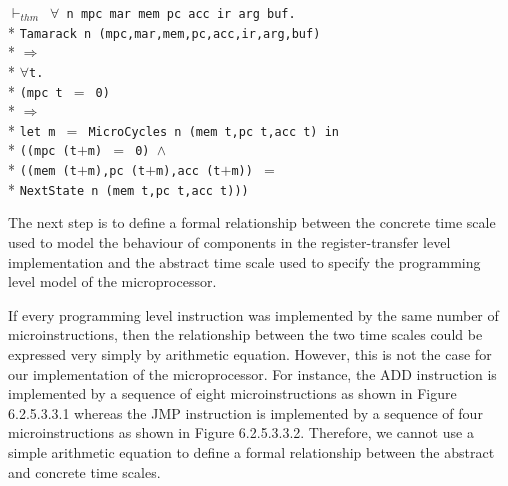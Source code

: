 \begin{normalsize}
\hspace*{\fill}
\begin{minipage}{17cm}
$\vdash_{thm}$\verb" "$\forall$\verb" n mpc mar mem pc acc ir arg buf."\\*
\verb"Tamarack n (mpc,mar,mem,pc,acc,ir,arg,buf)"\\*
$\Longrightarrow$\\*
$\forall$\verb"t."\\*
\verb"(mpc t "$=$\verb" 0)"\\*
$\Longrightarrow$\\*
\verb"let m "$=$\verb" MicroCycles n (mem t,pc t,acc t) in"\\*
\verb"((mpc (t"$+$\verb"m) "$=$\verb" 0) "$\wedge$\\*
\verb"((mem (t"$+$\verb"m),pc (t"$+$\verb"m),acc (t"$+$\verb"m)) "$=$\\*
\verb"NextState n (mem t,pc t,acc t)))"
\end{minipage}
\hspace*{\fill}

The next step is to
define a formal relationship between the concrete time scale used to model
the behaviour of components in the register-transfer level implementation
and the abstract time scale used to specify the programming
level model of the microprocessor.

If every programming level
instruction was implemented by the same number of microinstructions,
then the relationship between the two time scales could be expressed very
simply by arithmetic equation.
However, this is not the case for our implementation of the microprocessor.
For instance, the ADD instruction is implemented by a sequence of
eight microinstructions as shown in Figure 6.2.5.3.3.1
whereas the JMP instruction is implemented by
a sequence of four microinstructions as shown in Figure 6.2.5.3.3.2.
Therefore, we cannot use a simple arithmetic equation to define a formal
relationship between the abstract and concrete time scales.


\end{normalsize}
